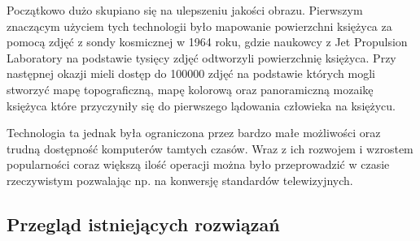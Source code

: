 Początkowo dużo skupiano się na ulepszeniu jakości obrazu. Pierwszym znaczącym użyciem tych technologii było mapowanie powierzchni księżyca za pomocą zdjęć z sondy kosmicznej w 1964 roku, gdzie naukowcy z Jet Propulsion Laboratory na podstawie tysięcy zdjęć odtworzyli powierzchnię księżyca. Przy następnej okazji mieli dostęp do 100000 zdjęć na podstawie których mogli stworzyć mapę topograficzną, mapę kolorową oraz panoramiczną mozaikę księżyca które przyczyniły się do pierwszego lądowania człowieka na księżycu. \cite{gonzalez2008}  

Technologia ta jednak była ograniczona przez bardzo małe możliwości oraz trudną dostępność komputerów tamtych czasów. Wraz z ich rozwojem i wzrostem popularności coraz większą ilość operacji można było przeprowadzić w czasie rzeczywistym pozwalając np. na konwersję standardów telewizyjnych. 
\subsection{Przegląd istniejących rozwiązań}